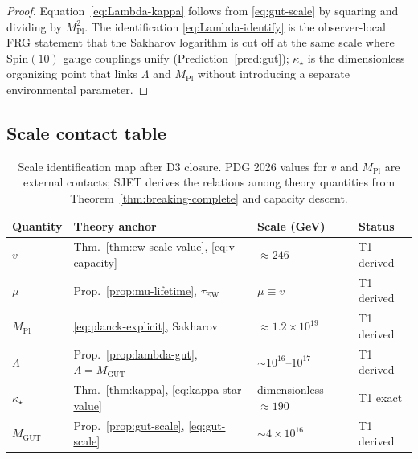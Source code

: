 \documentclass[11pt]{article}
\theoremstyle{plain}
\theoremstyle{definition}
\theoremstyle{remark}
\numberwithin{equation}{section}
\newcommand{\Spin}{\mathrm{Spin}}
\newcommand{\MPl}{M_{\mathrm{Pl}}}
\begin{document}
\begin{proof}
Equation~\eqref{eq:Lambda-kappa} follows from \eqref{eq:gut-scale} by
squaring and dividing by $\MPl^2$. The identification
\eqref{eq:Lambda-identify} is the observer-local FRG statement that the
Sakharov logarithm is cut off at the same scale where $\Spin(10)$ gauge
couplings unify (Prediction~\ref{pred:gut}); $\kappa_\star$ is the
dimensionless organizing point that links $\Lambda$ and $\MPl$ without
introducing a separate environmental parameter.
\end{proof}

\subsection{Scale contact table}
\label{sec:scales:table}

\begin{table}[ht]
\centering
\small
\renewcommand{\arraystretch}{1.12}
\begin{tabular}{@{}llll@{}}
\toprule
\textbf{Quantity} & \textbf{Theory anchor} & \textbf{Scale (GeV)} &
\textbf{Status} \\
\midrule
$v$ &
  Thm.~\ref{thm:ew-scale-value}, \eqref{eq:v-capacity} &
  $\approx 246$ &
  T1 derived \\
$\mu$ &
  Prop.~\ref{prop:mu-lifetime}, $\tau_{\mathrm{EW}}$ &
  $\mu\equiv v$ &
  T1 derived \\
$\MPl$ &
  \eqref{eq:planck-explicit}, Sakharov &
  $\approx 1.2\times 10^{19}$ &
  T1 derived \\
$\Lambda$ &
  Prop.~\ref{prop:lambda-gut}, $\Lambda=M_{\mathrm{GUT}}$ &
  $\sim 10^{16}$--$10^{17}$ &
  T1 derived \\
$\kappa_\star$ &
  Thm.~\ref{thm:kappa}, \eqref{eq:kappa-star-value} &
  dimensionless $\approx 190$ &
  T1 exact \\
$M_{\mathrm{GUT}}$ &
  Prop.~\ref{prop:gut-scale}, \eqref{eq:gut-scale} &
  $\sim 4\times 10^{16}$ &
  T1 derived \\
\bottomrule
\end{tabular}
\caption{Scale identification map after D3 closure. PDG 2026 values for $v$ and
$\MPl$ are external contacts; SJET derives the relations among theory
quantities from Theorem~\ref{thm:breaking-complete} and capacity descent.}
\label{tab:scale-map}
\end{table}
\end{document}
